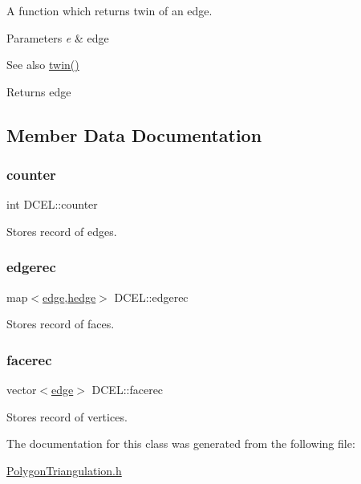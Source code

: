 A function which returns twin of an edge. 


\begin{DoxyParams}{Parameters}
{\em e} & edge \\
\hline
\end{DoxyParams}
\begin{DoxySeeAlso}{See also}
\hyperlink{class_d_c_e_l_a6829b94835f0c953a1f0c557131feef9}{twin()} 
\end{DoxySeeAlso}
\begin{DoxyReturn}{Returns}
edge 
\end{DoxyReturn}


\subsection{Member Data Documentation}
\mbox{\label{class_d_c_e_l_ab9bc9e59888b0dd878590eb146671bb0}} 
\subsubsection{\texorpdfstring{counter}{counter}}
{\footnotesize\ttfamily int D\+C\+E\+L\+::counter}

Stores record of edges. \mbox{\label{class_d_c_e_l_a88539db1a22065c15bc95f00e10ad693}} 
\subsubsection{\texorpdfstring{edgerec}{edgerec}}
{\footnotesize\ttfamily map$<$\hyperlink{_polygon_triangulation_8h_a4ef43ff5c6d42dacbc8ffd9c8cfdc189}{edge},\hyperlink{struct_half_edge}{hedge}$>$ D\+C\+E\+L\+::edgerec}

Stores record of faces. \mbox{\label{class_d_c_e_l_ad1c616dc2bbcf2682aa58c8da5bd3aae}} 
\subsubsection{\texorpdfstring{facerec}{facerec}}
{\footnotesize\ttfamily vector$<$\hyperlink{_polygon_triangulation_8h_a4ef43ff5c6d42dacbc8ffd9c8cfdc189}{edge}$>$ D\+C\+E\+L\+::facerec}

Stores record of vertices. 

The documentation for this class was generated from the following file\+:\begin{DoxyCompactItemize}
\item 
\hyperlink{_polygon_triangulation_8h}{Polygon\+Triangulation.\+h}\end{DoxyCompactItemize}
